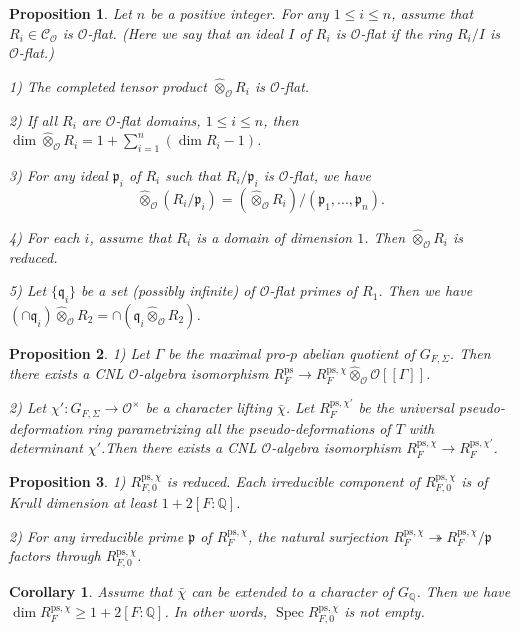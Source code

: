 \documentclass[10pt,a4paper]{amsart}
\newtheorem{prop}{Proposition}
\newtheorem{cor}{Corollary}
\newcommand{\Q}{\mathbb{Q}}
\DeclareMathOperator{\Spec}{Spec}
\newcommand{\cO}{\mathcal{O}}
\newcommand{\kp}{\mathfrak{p}}
\newcommand{\kq}{\mathfrak{q}}
\def\ps{\mathrm{ps}}
\begin{document}
	\begin{prop}\label{com alg}
		Let $n $ be a positive integer. For any $1 \le i \le n $, assume that $R_i \in \mathcal{C}_{\mathcal{O}}$ is $\cO$-flat. (Here we say that an ideal $I$ of $R_i$ is $\cO$-flat if the ring $R_i/I$ is $\cO$-flat.)
		
		1) The completed tensor product ${\widehat{\otimes}_\cO} R_i$ is $\cO$-flat.
		
		2) If all $R_i $ are $\cO$-flat domains, $1 \le i \le n$, then $\dim {\widehat{\otimes}_\cO} R_i = 1+ \sum_{i=1}^{n} (\dim R_i -1)$.
		
		3) For any ideal $\kp_i$ of $R_i $ such that $R_i/\kp_i$ is $\cO$-flat, we have $$ 
		\widehat{\otimes}_\cO (R_i/\kp_i) =(\widehat{\otimes}_\cO R_i)/(\kp_1, ..., \kp_n). $$
		
		4) For each $i$, assume that $R_i$ is a domain of dimension $1$.  Then ${\widehat{\otimes}_\cO} R_i $ is reduced.
		
		5) Let $\{\kq_i\}$ be a set (possibly infinite) of $\cO$-flat primes of $R_1$. Then we have $(\cap \kq_i) \widehat{\otimes}_\cO R_2 = \cap (\kq_i \widehat{\otimes}_\cO R_2)$.
	\end{prop}

    \begin{prop}\label{det}
    	1) Let $\Gamma$ be the maximal pro-$p$ abelian quotient of $G_{F, \Sigma} $. Then there exists a CNL $\cO$-algebra isomorphism $R_{F}^{\ps} \to R_{F}^{\ps, \chi} \widehat{\otimes}_\cO \cO[[\Gamma]] $.
    	
    	2) Let $\chi': G_{F,\Sigma} \to \cO^\times$ be a character lifting $\bar{\chi}$. Let $R_{F}^{\ps, \chi'}$ be the universal pseudo-deformation ring parametrizing all the pseudo-deformations of $T$ with determinant $\chi'$.Then there exists a CNL $\cO$-algebra isomorphism $ R_{F}^{\ps, \chi} \to R_{F}^{\ps, \chi'}$.
    \end{prop}

    \begin{prop}\label{def of 0}
    	1) $ R_{F,0}^{\ps, \chi}$ is reduced. Each irreducible component of $ R_{F,0}^{\ps, \chi}$ is of Krull dimension at least $1+2[F:\Q]$.
    	
    	2) For any irreducible prime $\kp$ of $R_{F}^{\ps, \chi} $, the natural surjection $ R_{F}^{\ps, \chi} \twoheadrightarrow R_{F}^{\ps, \chi}/\kp$ factors through $ R_{F,0}^{\ps, \chi}$.
    \end{prop}

	\begin{cor}\label{lower}
		Assume that $\bar{\chi}$ can be extended to a character of $G_\Q$. Then we have $\dim R_{F}^{\ps, \chi} \ge 1+2[F:\Q]$. In other words, $\Spec R_{F, 0}^{\ps, \chi}$ is not empty.
	\end{cor}
\end{document}
